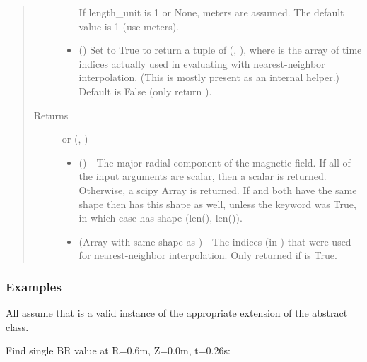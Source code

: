 \documentclass[letterpaper,10pt,english]{sphinxmanual}
\begin{document}
\begin{fulllineitems}
\begin{fulllineitems}
\begin{quote}
\begin{description}
\begin{itemize}
If length\_unit is 1 or None, meters are assumed. The default
value is 1 (use meters).


\item {} 
 () \textendash{} Set to True to return a tuple of (,
), where  is the array of time indices
actually used in evaluating  with nearest-neighbor
interpolation. (This is mostly present as an internal helper.)
Default is False (only return ).

\end{itemize}

\item[{Returns}] \leavevmode

 or (, )
\begin{itemize}
\item {} 
 () - The major radial component of
the magnetic field. If all of the input arguments are scalar, then
a scalar is returned. Otherwise, a scipy Array is returned. If 
and  both have the same shape then  has this shape as well,
unless the  keyword was True, in which case  has
shape (len(), len()).

\item {} 
 (Array with same shape as ) - The indices
(in ) that were used for
nearest-neighbor interpolation. Only returned if  is
True.

\end{itemize}


\end{description}\end{quote}
\subsubsection*{Examples}

All assume that  is a valid instance of the appropriate
extension of the  abstract class.

Find single BR value at R=0.6m, Z=0.0m, t=0.26s:


\end{fulllineitems}
\end{fulllineitems}
\end{document}
